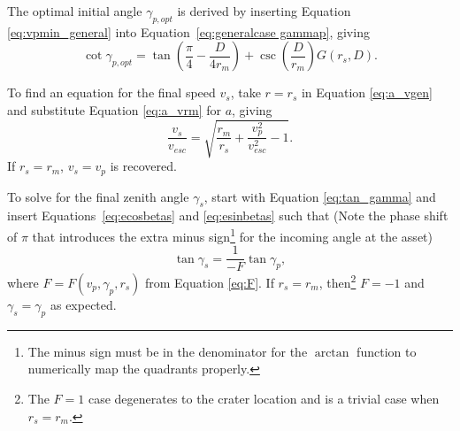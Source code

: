 \documentclass{article}
\begin{document}
The optimal initial angle $\gamma_{p,opt}$ is derived by inserting Equation \eqref{eq:vpmin_general} into Equation~\eqref{eq:generalcase gammap}, giving
\begin{equation}
\cot\gamma_{p,opt} = \tan\left(\frac{\pi}{4}-\frac{D}{4r_m}\right) + \csc\left(\frac{D}{r_m}\right)G(r_s,D).
\end{equation}

To find an equation for the final speed $v_s$, take $r=r_s$ in Equation \eqref{eq:a_vgen} and substitute Equation \eqref{eq:a_vrm} for $a$, giving
\begin{equation}
\frac{v_s}{v_{esc}} = \sqrt{\frac{r_m}{r_s} + \frac{v_p^2}{v_{esc}^2} - 1}.
\end{equation}
If $r_s=r_m$, $v_s=v_p$ is recovered.
%

To solve for the final zenith angle $\gamma_s$, start with Equation \eqref{eq:tan_gamma} and insert Equations~\eqref{eq:ecosbetas} and \eqref{eq:esinbetas} such that (Note the phase shift of $\pi$ that introduces the extra minus sign\footnote{The minus sign must be in the denominator for the $\arctan$ function to numerically map the quadrants properly.} for the incoming angle at the asset)
\begin{equation}
\tan\gamma_s = \frac{1}{-F}\tan\gamma_p,
\end{equation}
where $F = F(v_p,\gamma_p,r_s)$ from Equation \eqref{eq:F}. If $r_s = r_m$, then\footnote{The $F=1$ case degenerates to the crater location and is a trivial case when $r_s=r_m$.} $F=-1$ and $\gamma_s = \gamma_p$ as expected.
\end{document}

